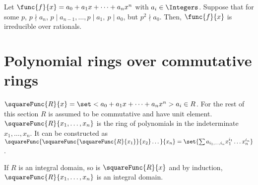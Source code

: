 \begin{theorem}
    Let \(\func{f}{x}=  a_0 + a_1x + \dots + a_nx^n\) with \(a_i \in \Integers\). Suppose that for some \(p\), \(p \nmid a_n\), \(p \mid a_{n-1}, \dots, p \mid a_1, \ p \mid a_0\), but \(p^2 \nmid a_0\). Then, \(\func{f}{x}\) is irreducible over rationals.
\end{theorem}

\section{Polynomial rings over commutative rings}
\(\squareFunc{R}{x} = \set<a_0 + a_1x + \dots + a_nx^n>{a_i \in R}\).
For the rest of this section \(R\) is assumed to be commutative and have unit element.
\(\squareFunc{R}{x_1, \dots, x_n}\) is the ring of polynomials in the indeterminate \(x_1, \dots, x_n\). It can be constructed as \(\squareFunc{\squareFunc{\squareFunc{R}{x_1}}{x_2}\dots}{x_n} = \set{\sum a_{i_1, \dots, i_n} x_1^{i_1} \dots x_n^{i_n}}\).

\begin{lemma}
    If \(R\) is an integral domain, so is \(\squareFunc{R}{x}\) and by induction, \(\squareFunc{R}{x_1, \dots, x_n}\) is an integral domain.
\end{lemma}